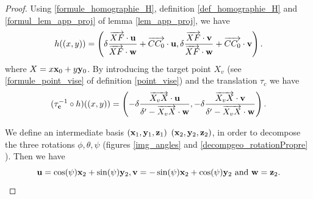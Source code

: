 \begin{proof}
Using \eqref{formule_homographie_H}, definition \ref{def_homographie_H} and \eqref{formul_lem_app_proj} of lemma \ref{lem_app_proj}, we have
\begin{equation*}
h((x,y))=\left( \delta \frac{\overrightarrow{XF}\cdot \mathbf{u}}{\overrightarrow{XF} \cdot \mathbf{w}} +\overrightarrow{CC_0 } \cdot \mathbf{u}, \delta \frac{\overrightarrow{XF}\cdot \mathbf{v}}{\overrightarrow{XF} \cdot  \mathbf{w}}+\overrightarrow{CC_0 }\cdot \mathbf{v} \right).
\end{equation*}
where $X=x \mathbf{x}_0 + y \mathbf{y}_0 $. By introducing the target point $X_v$ (see \eqref{formule_point_vise} of definition \ref{point_vise}) and the translation $\tau_c$ we have
\begin{equation}
(\tau_{\mathbf{c}}^{-1} \circ h)((x,y)) = \left ( -\delta \frac{\overrightarrow{X_vX}\cdot \mathbf{u}}{\delta' -\overrightarrow{X_vX} \cdot \mathbf{w}},-\delta \frac{\overrightarrow{X_vX}\cdot \mathbf{v}}{\delta' -\overrightarrow{X_vX} \cdot \mathbf{w}} \right).
\label{decomp_formul_intermediaire_1}
\end{equation}

\noindent We define an intermediate basis $(\mathbf{x}_1 ,\mathbf{y}_1 ,\mathbf{z}_1)$  $(\mathbf{x}_2 ,\mathbf{y}_2 ,\mathbf{z}_2)$, in order to decompose the three rotations $\phi,\theta,\psi$ (figures \ref{img_angles} and \ref{decompgeo_rotationPropre} ). Then we have
\begin{equation*}
\mathbf{u}=\cos(\psi)\mathbf{x}_{2}+\sin(\psi)\mathbf{y}_{2} ,  \mathbf{v}=-\sin(\psi)\mathbf{x}_{2}+\cos(\psi)\mathbf{y}_{2} \text{ and } \mathbf{w}=\mathbf{z}_2.
\end{equation*}


\end{proof}
